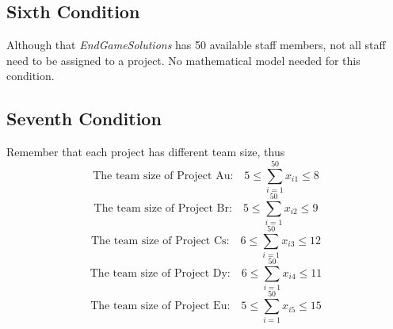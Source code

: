 \documentclass{article}
\begin{document}
\subsection{Sixth Condition}
Although that \textit{EndGameSolutions} has 50 available staff members, not all staff need to be assigned to a project. No mathematical model needed for this condition.

\subsection{Seventh Condition}
Remember that each project has different team size, thus
\[\text{The team size of Project Au:} \hspace{1em} 5 \le \sum_{i=1}^{50} x_{i1} \le 8\]
\[\text{The team size of Project Br:} \hspace{1em} 5 \le \sum_{i=1}^{50} x_{i2} \le 9\]
\[\text{The team size of Project Cs:} \hspace{1em} 6 \le \sum_{i=1}^{50} x_{i3} \le 12\]
\[\text{The team size of Project Dy:} \hspace{1em} 6 \le \sum_{i=1}^{50} x_{i4} \le 11\]
\[\text{The team size of Project Eu:} \hspace{1em} 5 \le \sum_{i=1}^{50} x_{i5} \le 15\]


\begin{comment}
\subsection{Eighth Condition*}
At least 34 staff should be assigned to at least one project (The remaining 16 or fewer will participate in other company work). This problem required an advanced mathematical modeling, so we're going to skip it for now.*
\[\sum_{i=5}^{50}\sum_{j=1}^{5}x_{ij} - 16 \ge 1\]
\end{comment}
\end{document}
